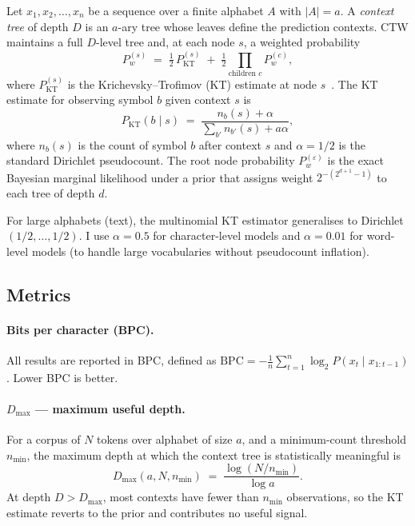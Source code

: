 \documentclass[11pt,a4paper]{article}
\newcommand{\bpc}{\mathrm{BPC}}
\newcommand{\dmax}{D_{\max}}
\begin{document}
Let $x_1, x_2, \ldots, x_n$ be a sequence over a finite alphabet $A$
with $|A| = a$.
A \emph{context tree} of depth $D$ is an $a$-ary tree whose leaves
define the prediction contexts.
CTW maintains a full $D$-level tree and, at each node $s$,
a weighted probability
\begin{equation}
  P_w^{(s)} \;=\; \tfrac{1}{2}\,P_{\mathrm{KT}}^{(s)}
  \;+\; \tfrac{1}{2}\prod_{\text{children } c}\!P_w^{(c)},
  \label{eq:ctw}
\end{equation}
where $P_{\mathrm{KT}}^{(s)}$ is the Krichevsky--Trofimov (KT) estimate
at node $s$~\citep{WST95}.
The KT estimate for observing symbol $b$ given context $s$ is
\begin{equation}
  P_{\mathrm{KT}}(b \mid s) \;=\; \frac{n_b(s) + \alpha}{\sum_{b'} n_{b'}(s) + a\alpha},
\end{equation}
where $n_b(s)$ is the count of symbol $b$ after context $s$ and
$\alpha = 1/2$ is the standard Dirichlet pseudocount.
The root node probability $P_w^{(\varepsilon)}$ is the exact Bayesian
marginal likelihood under a prior that assigns weight $2^{-(2^{d+1}-1)}$
to each tree of depth $d$.

For large alphabets (text), the multinomial KT estimator generalises to
Dirichlet$(1/2, \ldots, 1/2)$.
I use $\alpha = 0.5$ for character-level models and
$\alpha = 0.01$ for word-level models (to handle large vocabularies
without pseudocount inflation).

\subsection{Metrics}

\paragraph{Bits per character (BPC).}
All results are reported in BPC, defined as
$\bpc = -\frac{1}{n}\sum_{t=1}^{n}\log_2 P(x_t \mid x_{1:t-1})$.
Lower BPC is better.

\paragraph{$D_{\max}$ — maximum useful depth.}
For a corpus of $N$ tokens over alphabet of size $a$,
and a minimum-count threshold $n_{\min}$, the maximum depth at which
the context tree is statistically meaningful is
\begin{equation}
  \dmax(a, N, n_{\min}) \;=\; \frac{\log(N/n_{\min})}{\log a}.
  \label{eq:dmax}
\end{equation}
At depth $D > \dmax$, most contexts have fewer than $n_{\min}$ observations,
so the KT estimate reverts to the prior and contributes no useful signal.
\end{document}

